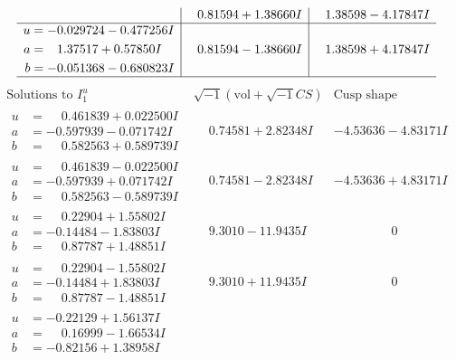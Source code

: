 \documentclass[1p]{elsarticle_modified}
\theoremstyle{definition}
\newcommand{\I}{\sqrt{-1}}
\begin{document}
$$\begin{array}{c|c|c}
 & \phantom{-}0.81594 + 1.38660 I & \phantom{-}1.38598 - 4.17847 I \\ \hline\begin{aligned}
u &= -0.029724 - 0.477256 I \\
a &= \phantom{-}1.37517 + 0.57850 I \\
b &= -0.051368 - 0.680823 I\end{aligned}
 & \phantom{-}0.81594 - 1.38660 I & \phantom{-}1.38598 + 4.17847 I\\
 \hline 
 \end{array}$$\newpage$$\begin{array}{c|c|c}  
\text{Solutions to }I^u_{1}& \I (\text{vol} + \sqrt{-1}CS) & \text{Cusp shape}\\
 \hline 
\begin{aligned}
u &= \phantom{-}0.461839 + 0.022500 I \\
a &= -0.597939 - 0.071742 I \\
b &= \phantom{-}0.582563 + 0.589739 I\end{aligned}
 & \phantom{-}0.74581 + 2.82348 I & -4.53636 - 4.83171 I \\ \hline\begin{aligned}
u &= \phantom{-}0.461839 - 0.022500 I \\
a &= -0.597939 + 0.071742 I \\
b &= \phantom{-}0.582563 - 0.589739 I\end{aligned}
 & \phantom{-}0.74581 - 2.82348 I & -4.53636 + 4.83171 I \\ \hline\begin{aligned}
u &= \phantom{-}0.22904 + 1.55802 I \\
a &= -0.14484 - 1.83803 I \\
b &= \phantom{-}0.87787 + 1.48851 I\end{aligned}
 & \phantom{-}9.3010 - 11.9435 I & \phantom{-0.000000 } 0 \\ \hline\begin{aligned}
u &= \phantom{-}0.22904 - 1.55802 I \\
a &= -0.14484 + 1.83803 I \\
b &= \phantom{-}0.87787 - 1.48851 I\end{aligned}
 & \phantom{-}9.3010 + 11.9435 I & \phantom{-0.000000 } 0 \\ \hline\begin{aligned}
u &= -0.22129 + 1.56137 I \\
a &= \phantom{-}0.16999 - 1.66534 I \\
b &= -0.82156 + 1.38958 I\end{aligned}

\end{array}$$
\end{document}
